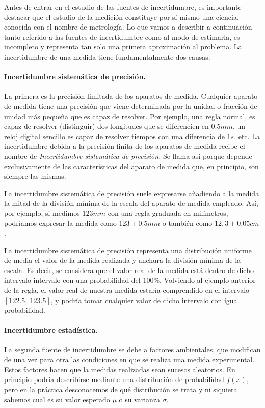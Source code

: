Antes de entrar en el estudio de las fuentes de incertidumbre, es importante destacar que el estudio de la medición constituye por sí mismo una ciencia, conocida con el nombre de metrología. Lo que vamos a describir a continuación tanto referido a las fuentes de incertidumbre como al modo de estimarla, es incompleto y representa tan solo una primera aproximación al problema.
La incertidumbre de una medida tiene fundamentalmente dos causas:

\paragraph{Incertidumbre sistemática de precisión.}
 La primera es la precisión limitada de los aparatos de medida. Cualquier aparato de medida tiene una precisión que viene determinada por la unidad o fracción de unidad más pequeña que es capaz de resolver. Por ejemplo, una regla normal, es capaz de resolver (distinguir) dos longitudes que se diferencien en $0.5 mm$, un reloj digital sencillo es capaz de resolver tiempos con una diferencia de $1s.$ etc.
La incertidumbre debida a la precisión finita de los aparatos de medida recibe el nombre de \emph{Incertidumbre sistemática de precisión.} 
Se llama así porque depende exclusivamente de las características del aparato de medida que, en principio, son siempre las mismas.

La incertidumbre sistemática de precisión suele expresarse añadiendo a la medida la mitad de la división mínima de la escala del aparato de medida empleado. Así, por ejemplo, si medimos $123 mm$ con una regla graduada en milímetros, podríamos expresar la  medida como $123 \pm 0.5 mm$ o también como $12,3\pm0.05cm$.


La incertidumbre sistemática de precisión representa una distribución uniforme de media el valor de la medida realizada y anchura la división mínima de la escala. Es decir, se considera que el valor real de la medida está dentro de dicho intervalo intervalo con una probabilidad del $100\%$. Volviendo al ejemplo anterior de la regla, el valor real de nuestra medida estaría comprendido en el intervalo $[122.5,\ 123.5 ]$, y podría tomar cualquier valor de dicho intervalo con igual probabilidad. 

\paragraph{Incertidumbre estadística.} La segunda fuente de incertidumbre se debe a factores ambientales, que modifican de una vez para otra las condiciones en que se realiza una medida experimental. Estos factores hacen que la medidas realizadas sean sucesos aleatorios. En principio podría describirse mediante una distribución de probabilidad $f(x)$, pero en la práctica desconocemos de qué distribución se trata y ni siquiera sabemos cual es su valor esperado $\mu$ o su varianza $\sigma$. 

